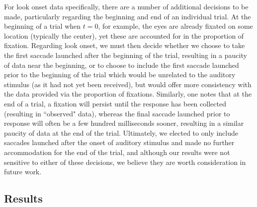 \documentclass{article}
\begin{document}
For look onset data specifically, there are a number of additional decisions to be made, particularly regarding the beginning and end of an individual trial. At the beginning of a trial when $t = 0$, for example, the eyes are already fixated on some location (typically the center), yet these are accounted for in the proportion of fixation. Regarding look onset, we must then decide whether we choose to take the first saccade launched after the beginning of the trial, resulting in a paucity of data near the beginning, or to choose to include the first saccade launched prior to the beginning of the trial which would be unrelated to the auditory stimulus (as it had not yet been received), but would offer more consistency with the data provided via the proportion of fixations. Similarly, one notes that at the end of a trial, a fixation will persist until the response has been collected (resulting in ``observed" data), whereas the final saccade launched prior to response will often be a few hundred milliseconds sooner, resulting in a similar paucity of data at the end of the trial. Ultimately, we elected to only include saccades launched after the onset of auditory stimulus and made no further accommodation for the end of the trial, and although our results were not sensitive to either of these decisions, we believe they are worth consideration in future work.


\subsection{Results}
\end{document}

